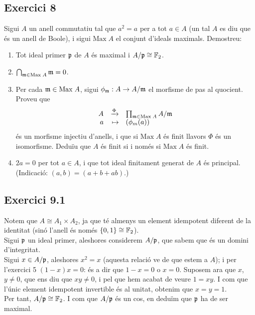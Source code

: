 \documentclass[11pt, a4paper]{article}
\begin{document}
\subsection{Exercici 8}
\newpage
\begin{tcolorbox}[title=\section{Exercici 9}]
Sigui $A$ un anell commutatiu tal que $a^2=a$ per a tot $a\in A$ (un tal $A$ es diu que és un anell de Boole), i sigui $\mathrm{Max}\; A$ el conjunt d'ideals maximals. Demostreu:
\begin{enumerate}
    \item Tot ideal primer $\mathfrak p$ de $A$ és maximal i $A/\mathfrak p\cong \mathbb F_2$.
    \item $\bigcap_{\mathfrak m\in\mathrm{Max}\;A}\mathfrak m=0$.
    \item Per cada $\mathfrak m \in \mathrm{Max}\;A$, sigui $\phi_\mathfrak {m} : A \to A/\mathfrak m$ el morfisme de pas al quocient. Proveu que
\[
\begin{array}{rrl}
    A&\xrightarrow{\Phi} &\prod _{\mathfrak m\in \mathrm{ Max}\; A}A/\mathfrak m\\
    a&\mapsto &(\phi_m(a))
\end{array}
\]
és un morfisme injectiu d'anells, i que si $\mathrm {Max}\;A$ és finit llavors $\Phi$ és un isomorfisme.
Deduïu que $A$ és finit si i només si $\mathrm{Max}\;A$ és finit.
\item  $2a = 0$ per tot $a \in A$, i que tot ideal finitament generat de $A$ és principal.\\
(Indicació: $(a, b) = (a + b + ab)$.)
\end{enumerate}
\end{tcolorbox}
\subsection{Exercici 9.1}
Notem que $A\cong A_1\times A_2$, ja que té almenys un element idempotent diferent de la identitat (sinó l'anell és només $\{0,1\}\cong \mathbb F_2$).\\
Sigui $\mathfrak p$ un ideal primer, aleshores considerem $A/\mathfrak p$, que sabem que és un domini d'integritat.\\
Sigui $x\in A/\mathfrak p$, aleshores $x^2=x$ (aquesta relació ve de que estem a $A$); i per l'exercici 5 $(1-x)x=0$: és a dir que $1-x=0$ o $x=0$. Suposem ara que $x$, $y\neq 0$, que ens diu que $xy\neq 0$, i pel que hem acabat de veure $1=xy$. I com que l'únic element idempotent invertible és al unitat, obtenim que $x=y=1$.\\
Per tant, $A/\mathfrak p\cong \mathbb F_2$. I com que $A/\mathfrak p$ és un cos, en deduïm que $\mathfrak p$ ha de ser maximal.
\end{document}
